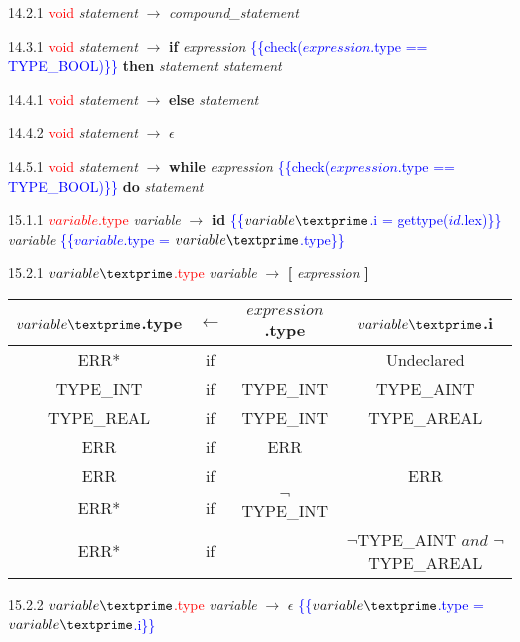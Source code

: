 14.2.1 \textcolor{red}{void} \emph{statement} $\rightarrow$ \emph{compound\_statement}

14.3.1 \textcolor{red}{void} \emph{statement} $\rightarrow$ \textbf{if} \emph{expression} \textcolor{blue}{\{\{check($expression$.type == TYPE_BOOL)\}\}} \textbf{then} \emph{statement} \emph{statement\textprime}

14.4.1 \textcolor{red}{void} \emph{statement\textprime} $\rightarrow$ \textbf{else} \emph{statement}

14.4.2 \textcolor{red}{void} \emph{statement\textprime} $\rightarrow$ $\epsilon$

14.5.1 \textcolor{red}{void} \emph{statement} $\rightarrow$ \textbf{while} \emph{expression} \textcolor{blue}{\{\{check($expression$.type == TYPE_BOOL)\}\}} \textbf{do} \emph{statement}

15.1.1 \textcolor{red}{$variable$.type} \emph{variable} $\rightarrow$ \textbf{id} \textcolor{blue}{\{\{$variable\textprime$.i = gettype($id$.lex)\}\}} \emph{variable\textprime} \textcolor{blue}{\{\{$variable$.type = $variable\textprime$.type\}\}}

15.2.1 \textcolor{red}{$variable\textprime$.type} \emph{variable\textprime} $\rightarrow$ \textbf{[} \emph{expression} \textbf{]}

\begin{tabular}[t]{|c|c|c|c|}
  \hline

  $variable\textprime$.type & \textbf{$\leftarrow$} & $expression$.type & $variable\textprime$.i \\

  \hline

  ERR* & if & & Undeclared \\
  TYPE_INT & if & TYPE_INT & TYPE_AINT \\
  TYPE_REAL & if & TYPE_INT & TYPE_AREAL \\
  ERR & if & ERR & \\
  ERR & if & & ERR \\
  ERR* & if & $\neg$TYPE_INT & \\
  ERR* & if & & $\neg$TYPE_AINT $and$ $\neg$TYPE_AREAL \\

  \hline

\end{tabular}


15.2.2 \textcolor{red}{$variable\textprime$.type} \emph{variable\textprime} $\rightarrow$ $\epsilon$ \textcolor{blue}{\{\{$variable\textprime$.type = $variable\textprime$.i\}\}}

